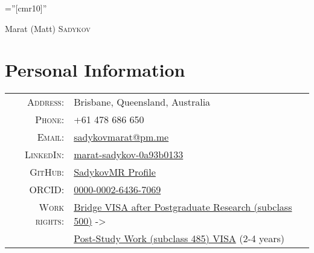 \documentclass[a4paper,12pt]{article}
\begin{document}

\pagestyle{empty} %

\font\fb=''[cmr10]'' %

\par{\centering
		{\Huge Marat (Matt) \textsc{Sadykov}
	}\bigskip\par}

\section{Personal Information}

\begin{tabular}{rl}
    \textsc{Address:}   & Brisbane, Queensland, Australia\\
    \textsc{Phone:}     & +61 478 686 650\\
    \textsc{Email:}     & \href{mailto:sadykovmarat@pm.me}{sadykovmarat@pm.me} \\
    \textsc{LinkedIn:}  & \href{https://www.linkedin.com/in/marat-sadykov-0a93b0133/}{marat-sadykov-0a93b0133} \\
    \textsc{GitHub:}    & \href{https://github.com/SmugglerSMR}{SadykovMR Profile} \\
    \textsc{ORCID:}    & \href{https://orcid.org/0000-0002-6436-7069}{0000-0002-6436-7069} \\
    \textsc{Work rights:} & \href{https://immi.homeaffairs.gov.au/visas/getting-a-visa/visa-listing/student-500}{Bridge VISA after Postgraduate Research (subclass 500)} -> \\
    & \href{https://immi.homeaffairs.gov.au/visas/getting-a-visa/visa-listing/temporary-graduate-485/post-study-work}{Post-Study Work (subclass 485) VISA} (2-4 years)
\end{tabular}
\end{document}
